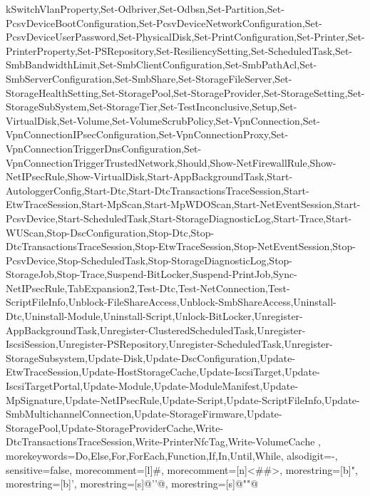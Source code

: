 {{kSwitchVlanProperty,Set-Odbriver,Set-Odbsn,Set-Partition,Set-PcsvDeviceBootConfiguration,Set-PcsvDeviceNetworkConfiguration,Set-PcsvDeviceUserPassword,Set-PhysicalDisk,Set-PrintConfiguration,Set-Printer,Set-PrinterProperty,Set-PSRepository,Set-ResiliencySetting,Set-ScheduledTask,Set-SmbBandwidthLimit,Set-SmbClientConfiguration,Set-SmbPathAcl,Set-SmbServerConfiguration,Set-SmbShare,Set-StorageFileServer,Set-StorageHealthSetting,Set-StoragePool,Set-StorageProvider,Set-StorageSetting,Set-StorageSubSystem,Set-StorageTier,Set-TestInconclusive,Setup,Set-VirtualDisk,Set-Volume,Set-VolumeScrubPolicy,Set-VpnConnection,Set-VpnConnectionIPsecConfiguration,Set-VpnConnectionProxy,Set-VpnConnectionTriggerDnsConfiguration,Set-VpnConnectionTriggerTrustedNetwork,Should,Show-NetFirewallRule,Show-NetIPsecRule,Show-VirtualDisk,Start-AppBackgroundTask,Start-AutologgerConfig,Start-Dtc,Start-DtcTransactionsTraceSession,Start-EtwTraceSession,Start-MpScan,Start-MpWDOScan,Start-NetEventSession,Start-PcsvDevice,Start-ScheduledTask,Start-StorageDiagnosticLog,Start-Trace,Start-WUScan,Stop-DscConfiguration,Stop-Dtc,Stop-DtcTransactionsTraceSession,Stop-EtwTraceSession,Stop-NetEventSession,Stop-PcsvDevice,Stop-ScheduledTask,Stop-StorageDiagnosticLog,Stop-StorageJob,Stop-Trace,Suspend-BitLocker,Suspend-PrintJob,Sync-NetIPsecRule,TabExpansion2,Test-Dtc,Test-NetConnection,Test-ScriptFileInfo,Unblock-FileShareAccess,Unblock-SmbShareAccess,Uninstall-Dtc,Uninstall-Module,Uninstall-Script,Unlock-BitLocker,Unregister-AppBackgroundTask,Unregister-ClusteredScheduledTask,Unregister-IscsiSession,Unregister-PSRepository,Unregister-ScheduledTask,Unregister-StorageSubsystem,Update-Disk,Update-DscConfiguration,Update-EtwTraceSession,Update-HostStorageCache,Update-IscsiTarget,Update-IscsiTargetPortal,Update-Module,Update-ModuleManifest,Update-MpSignature,Update-NetIPsecRule,Update-Script,Update-ScriptFileInfo,Update-SmbMultichannelConnection,Update-StorageFirmware,Update-StoragePool,Update-StorageProviderCache,Write-DtcTransactionsTraceSession,Write-PrinterNfcTag,Write-VolumeCache
	},
	morekeywords={Do,Else,For,ForEach,Function,If,In,Until,While},
	alsodigit={-},
	sensitive=false,
	morecomment=[l]{\#},
	morecomment=[n]{<\#}{\#>},
	morestring=[b]{"},
	morestring=[b]{'},
	morestring=[s]{@'}{'@},
	morestring=[s]{@"}{"@}
}

